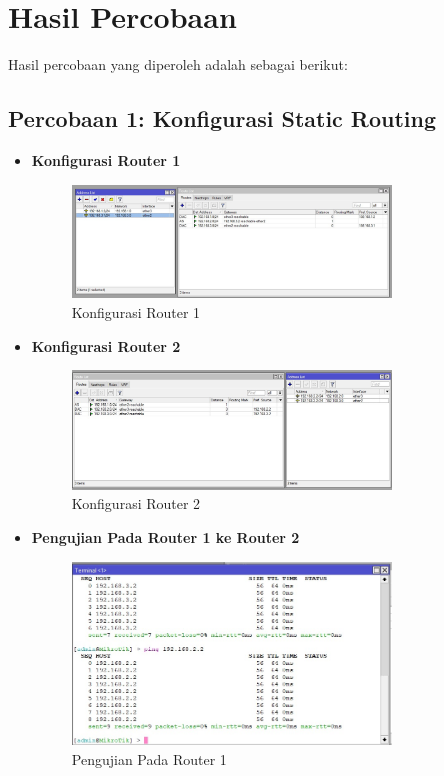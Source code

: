 \section*{Hasil Percobaan} %

Hasil percobaan yang diperoleh adalah sebagai berikut:

\subsection*{Percobaan 1: Konfigurasi Static Routing}

\begin{itemize}
    \item \textbf{Konfigurasi Router 1}
    \begin{figure} [H]
        \centering
        \includegraphics[width=0.8\textwidth]{img/percobaan 1_1_config.jpeg}
        \caption{Konfigurasi Router 1}
        \label{fig:router1}
    \end{figure}

    \item \textbf{Konfigurasi Router 2}
    \begin{figure} [H]
        \centering
        \includegraphics[width=0.8\textwidth]{img/percobaan 1_2_config.jpeg}
        \caption{Konfigurasi Router 2}
        \label{fig:router2}
    \end{figure}

    \item \textbf{Pengujian Pada Router 1 ke Router 2}
    \begin{figure} [H]
        \centering
        \includegraphics[width=0.8\textwidth]{img/percobaan 1_1_hasil.jpeg}
        \caption{Pengujian Pada Router 1}
        \label{fig:ping1}
    \end{figure}


\end{itemize}
